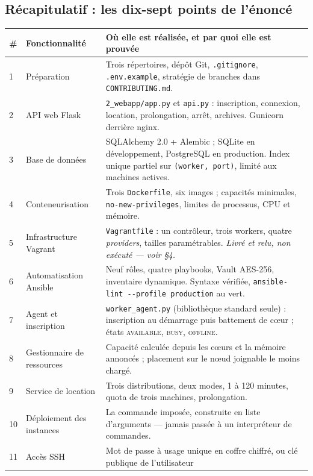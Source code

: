 \documentclass[11pt,a4paper]{article}
\begin{document}
\subsection*{Récapitulatif : les dix-sept points de l'énoncé}
\nopagebreak
{\small
\begin{tabularx}{\textwidth}{@{}p{0.45cm}p{3.5cm}>{\raggedright\arraybackslash}X@{}}
\toprule
\textbf{\#} & \textbf{Fonctionnalité} & \textbf{Où elle est réalisée, et par quoi elle est prouvée} \\
\midrule
1 & Préparation & Trois répertoires, dépôt Git, \texttt{.gitignore}, \texttt{.env.example},
stratégie de branches dans \texttt{CONTRIBUTING.md}. \\
2 & API web Flask & \texttt{2\_webapp/app.py} et \texttt{api.py} : inscription, connexion,
location, prolongation, arrêt, archives. Gunicorn derrière nginx. \\
3 & Base de données & SQLAlchemy 2.0 + Alembic ; SQLite en développement, PostgreSQL en
production. Index unique partiel sur \texttt{(worker, port)}, limité aux machines actives. \\
4 & Conteneurisation & Trois \texttt{Dockerfile}, six images ; capacités minimales,
\texttt{no-new-privileges}, limites de processus, CPU et mémoire. \\
5 & Infrastructure Vagrant & \texttt{Vagrantfile} : un contrôleur, trois workers, quatre
\emph{providers}, tailles paramétrables. \emph{Livré et relu, non exécuté --- voir §4.} \\
6 & Automatisation Ansible & Neuf rôles, quatre playbooks, Vault AES-256, inventaire dynamique.
Syntaxe vérifiée, \texttt{ansible-lint -{}-profile production} au vert. \\
7 & Agent et inscription & \texttt{worker\_agent.py} (bibliothèque standard seule) : inscription
au démarrage puis battement de c\oe{}ur ; états \textsc{available}, \textsc{busy}, \textsc{offline}. \\
8 & Gestionnaire de ressources & Capacité calculée depuis les c\oe{}urs et la mémoire annoncés ;
placement sur le n\oe{}ud joignable le moins chargé. \\
9 & Service de location & Trois distributions, deux modes, 1 à 120 minutes, quota de trois
machines, prolongation. \\
10 & Déploiement des instances & La commande imposée, construite en liste d'arguments --- jamais
passée à un interpréteur de commandes. \\
11 & Accès SSH & Mot de passe à usage unique en coffre chiffré, ou clé publique de l'utilisateur

\end{tabularx}}
\end{document}
